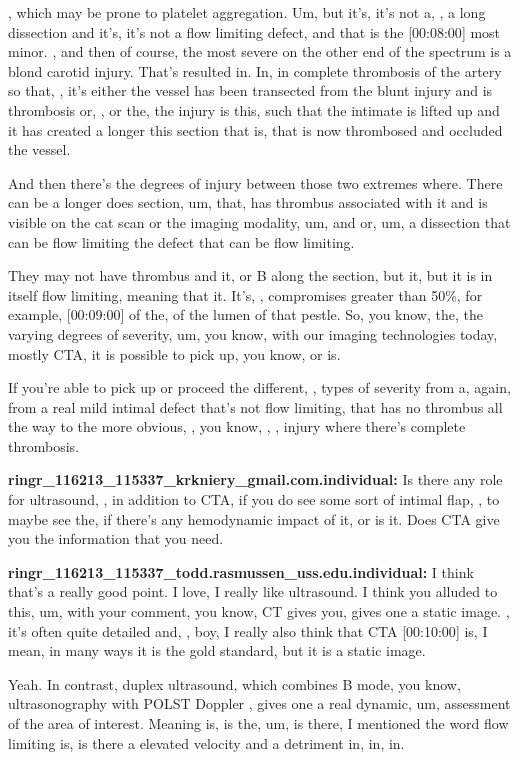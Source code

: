 \documentclass[
]{book}
\begin{document}
, which may be prone to platelet aggregation. Um, but it's, it's not a,
, a long dissection and it's, it's not a flow limiting defect, and that
is the {[}00:08:00{]} most minor. , and then of course, the most severe on
the other end of the spectrum is a blond carotid injury. That's resulted
in. In, in complete thrombosis of the artery so that, , it's either the
vessel has been transected from the blunt injury and is thrombosis or, ,
or the, the injury is this, such that the intimate is lifted up and it
has created a longer this section that is, that is now thrombosed and
occluded the vessel.

And then there's the degrees of injury between those two extremes where.
There can be a longer does section, um, that, has thrombus associated
with it and is visible on the cat scan or the imaging modality, um, and
or, um, a dissection that can be flow limiting the defect that can be
flow limiting.

They may not have thrombus and it, or B along the section, but it, but
it is in itself flow limiting, meaning that it. It's, , compromises
greater than 50\%, for example, {[}00:09:00{]} of the, of the lumen of that
pestle. So, you know, the, the varying degrees of severity, um, you
know, with our imaging technologies today, mostly CTA, it is possible to
pick up, you know, or is.

If you're able to pick up or proceed the different, , types of severity
from a, again, from a real mild intimal defect that's not flow limiting,
that has no thrombus all the way to the more obvious, , you know, , ,
injury where there's complete thrombosis.

\textbf{ringr\_116213\_115337\_krkniery\_gmail.com.individual:} Is there any role
for ultrasound, , in addition to CTA, if you do see some sort of intimal
flap, , to maybe see the, if there's any hemodynamic impact of it, or is
it. Does CTA give you the information that you need.

\textbf{ringr\_116213\_115337\_todd.rasmussen\_uss.edu.individual:} I think
that's a really good point. I love, I really like ultrasound. I think
you alluded to this, um, with your comment, you know, CT gives you,
gives one a static image. , it's often quite detailed and, , boy, I
really also think that CTA {[}00:10:00{]} is, I mean, in many ways it is the
gold standard, but it is a static image.

Yeah. In contrast, duplex ultrasound, which combines B mode, you know,
ultrasonography with POLST Doppler , gives one a real dynamic, um,
assessment of the area of interest. Meaning is, is the, um, is there, I
mentioned the word flow limiting is, is there a elevated velocity and a
detriment in, in, in.
\end{document}
